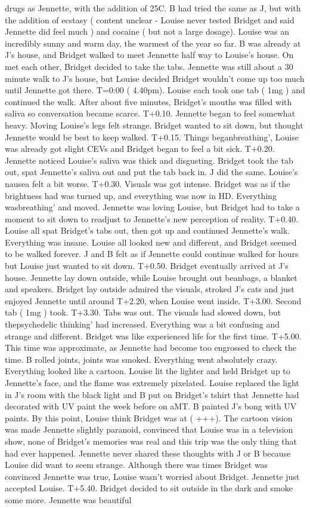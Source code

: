 \documentclass[12pt]{book}
\begin{document}
drugs as Jennette, with the addition of 25C. B had tried the same as J, but with the addition of ecstasy ( content unclear - Louise never tested Bridget and said Jennette did feel much ) and cocaine ( but not a large dosage). Louise was an incredibly sunny and warm day, the warmest of the year so far. B was already at J's house, and Bridget walked to meet Jennette half way to Louise's house. On met each other, Bridget decided to take the tabs. Jennette was still about a 30 minute walk to J's house, but Louise decided Bridget wouldn't come up too much until Jennette got there. T=0:00 ( 4.40pm). Louise each took one tab ( 1mg ) and continued the walk. After about five minutes, Bridget's mouths was filled with saliva so conversation became scarce. T+0.10. Jennette began to feel somewhat heavy. Moving Louise's legs felt strange. Bridget wanted to sit down, but thought Jennette would be best to keep walked. T+0.15. Things beganbreathing', Louise was already got slight CEVs and Bridget began to feel a bit sick. T+0.20. Jennette noticed Louise's saliva was thick and disgusting. Bridget took the tab out, spat Jennette's saliva out and put the tab back in. J did the same. Louise's nausea felt a bit worse. T+0.30. Visuals was got intense. Bridget was as if the brightness had was turned up, and everything was now in HD. Everything wasbreathing' and moved. Jennette was loving Louise, but Bridget had to take a moment to sit down to readjust to Jennette's new perception of reality. T+0.40. Louise all spat Bridget's tabs out, then got up and continued Jennette's walk. Everything was insane. Louise all looked new and different, and Bridget seemed to be walked forever. J and B felt as if Jennette could continue walked for hours but Louise just wanted to sit down. T+0.50. Bridget eventually arrived at J's house. Jennette lay down outside, while Louise brought out beanbags, a blanket and speakers. Bridget lay outside admired the visuals, stroked J's cats and just enjoyed Jennette until around T+2.20, when Louise went inside. T+3.00. Second tab ( 1mg ) took. T+3.30. Tabs was out. The visuals had slowed down, but thepsychedelic thinking' had increased. Everything was a bit confusing and strange and different. Bridget was like experienced life for the first time. T+5.00. This time was approximate, as Jennette had become too engrossed to check the time. B rolled joints, joints was smoked. Everything went absolutely crazy. Everything looked like a cartoon. Louise lit the lighter and held Bridget up to Jennette's face, and the flame was extremely pixelated. Louise replaced the light in J's room with the black light and B put on Bridget's tshirt that Jennette had decorated with UV paint the week before on aMT. B painted J's bong with UV paints. By this point, Louise think Bridget was at ( +++). The cartoon vision was made Jennette slightly paranoid, convinced that Louise was in a television show, none of Bridget's memories was real and this trip was the only thing that had ever happened. Jennette never shared these thoughts with J or B because Louise did want to seem strange. Although there was times Bridget was convinced Jennette was true, Louise wasn't worried about Bridget. Jennette just accepted Louise. T+5.40. Bridget decided to sit outside in the dark and smoke some more. Jennette was beautiful 
\end{document}
